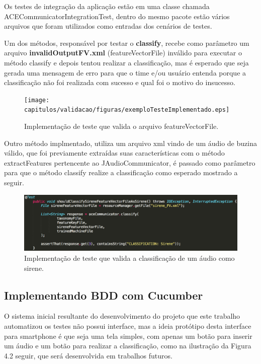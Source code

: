 \begin{itemize}
Os testes de integração da aplicação estão em uma classe chamada ACECommunicatorIntegrationTest, dentro do mesmo pacote estão vários arquivos que foram utilizados como entradas dos cenários de testes.

Um dos métodos, responsável por testar o \textbf{classify}, recebe como parâmetro um arquivo \textbf{invalidOutputFV.xml} (featureVectorFile) inválido para executar o método classify e depois tentou realizar a classificação, mas é esperado que seja gerada uma mensagem de erro para que o time e/ou usuário entenda porque a classificação não foi realizada com sucesso e qual foi o motivo do insucesso.

\begin{figure}[H]
	\centering
	\captionsetup{justification=centering,margin=2cm}
	\texttt{[image: capitulos/validacao/figuras/exemploTesteImplementado.eps]}
	\caption{Implementação de teste que valida o arquivo featureVectorFile. }
	\label{fig:result-engajamento}
\end{figure}

 Outro método implmentado, utiliza um arquivo xml vindo de um áudio de buzina válido, que foi previamente extraídas suas características com o método extractFeatures pertencente ao JAudioCommunicator, é passado como parâmetro para que o método classify realize a classificação como esperado mostrado a seguir.
 
\begin{figure}[H]
	\centering
	\captionsetup{justification=centering,margin=2cm}
	\includegraphics[scale=0.55]{capitulos/validacao/figuras/outroTesteImplementado.eps}
	\caption{Implementação de teste que valida a classificação de um áudio como sirene.}
	\label{fig:result-engajamento}
\end{figure}

\end{itemize}

\subsection{Implementando BDD com Cucumber}

O sistema inicial resultante do desenvolvimento do projeto que este trabalho automatizou os testes não possui interface, mas a ideia protótipo desta interface para smartphone é que seja uma tela simples, com apenas um botão para inserir um áudio e um botão para realizar a classificação, como na ilustração da Figura 4.2 seguir, que será desenvolvida em trabalhos futuros.

